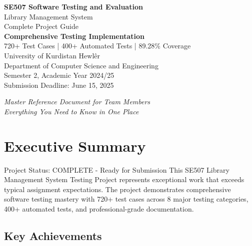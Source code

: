 \documentclass[12pt,a4paper]{article}
\begin{document}
\begin{titlepage}
    \centering
    \vspace*{2cm}
    
    {\Huge\bfseries SE507 Software Testing and Evaluation}\\[0.5cm]
    {\Large Library Management System}\\[0.3cm]
    {\Large Complete Project Guide}\\[2cm]
    
    {\large\bfseries Comprehensive Testing Implementation}\\[0.5cm]
    {\large 720+ Test Cases | 400+ Automated Tests | 89.28\% Coverage}\\[2cm]
    
    {\large University of Kurdistan Hewlêr}\\[0.3cm]
    {\large Department of Computer Science and Engineering}\\[0.5cm]
    {\large Semester 2, Academic Year 2024/25}\\[2cm]
    
    {\large Submission Deadline: June 15, 2025}\\[1cm]
    
    \vfill
    
    {\large\textit{Master Reference Document for Team Members}}\\
    {\large\textit{Everything You Need to Know in One Place}}
    
\end{titlepage}

\tableofcontents
\newpage

\section{Executive Summary}

\begin{successbox}{Project Status: COMPLETE - Ready for Submission}
This SE507 Library Management System Testing Project represents exceptional work that exceeds typical assignment expectations. The project demonstrates comprehensive software testing mastery with 720+ test cases across 8 major testing categories, 400+ automated tests, and professional-grade documentation.
\end{successbox}

\subsection{Key Achievements}
\end{document}
